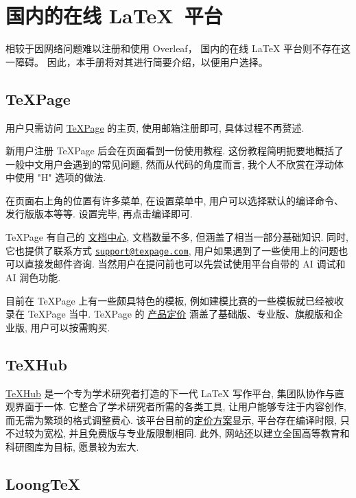 \section{国内的在线 \LaTeX\ 平台}

相较于因网络问题难以注册和使用 Overleaf，
国内的在线 \LaTeX{} 平台则不存在这一障碍。
因此，本手册将对其进行简要介绍，以便用户选择。

\subsection{TeXPage}

用户只需访问 \href{https://www.texpage.com/}{TeXPage} 的主页,
使用邮箱注册即可,
具体过程不再赘述.

新用户注册 TeXPage 后会在页面看到一份使用教程.
这份教程简明扼要地概括了一般中文用户会遇到的常见问题,
然而从代码的角度而言,
我个人不欣赏在浮动体中使用 "H" 选项的做法.

在页面右上角的位置有许多菜单,
在\textsf{设置}菜单中,
用户可以选择默认的编译命令、发行版版本等等.
设置完毕,
再点击编译即可.

TeXPage 有自己的%
\href{https://www.texpage.com/docs}{文档中心},
文档数量不多,
但涵盖了相当一部分基础知识.
同时,
它也提供了联系方式 \href{mailto:support@texpage.com}%
{\texttt{support@texpage.com}},
用户如果遇到了一些使用上的问题也可以直接发邮件咨询.
当然用户在提问前也可以先尝试使用平台自带的 AI 调试和 AI 润色功能.

目前在 TeXPage 上有一些颇具特色的模板,
例如建模比赛的一些模板就已经被收录在 TeXPage 当中.
TeXPage 的%
\href{https://www.texpage.com/zh/pricing}{产品定价}%
涵盖了基础版、专业版、旗舰版和企业版,
用户可以按需购买.

\subsection{TeXHub}

\href{https://www.texhub.com/}{TeXHub} 是一个专为学术研究者打造的下一代 \LaTeX{} 写作平台,
集团队协作与直观界面于一体.
它整合了学术研究者所需的各类工具,
让用户能够专注于内容创作,
而无需为繁琐的格式调整费心.
该平台目前的\href{https://www.texhub.com/pricing}{定价方案}显示,
平台存在编译时限,
只不过较为宽松,
并且免费版与专业版限制相同.
此外,
网站还以建立全国高等教育和科研图库为目标,
愿景较为宏大.

\subsection{LoongTeX}

